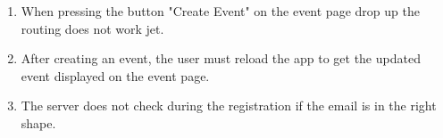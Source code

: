 \begin{enumerate}
    \item When pressing the button "Create Event" on the event page drop up the routing does not work jet.
    \item After creating an event, the user must reload the app to get the updated event displayed on the event page.
    \item The server does not check during the registration if the email is in the right shape.
\end{enumerate}